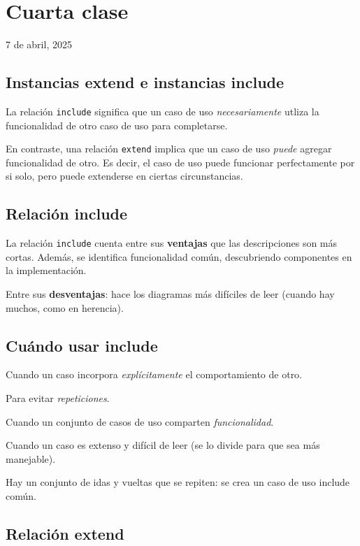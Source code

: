 \section{Cuarta clase}

7 de abril, 2025

\subsection{Instancias extend e instancias include}

La relación \texttt{include} significa que un caso de uso \textit{necesariamente} utliza la funcionalidad de otro caso de uso para completarse.

En contraste, una relación \texttt{extend} implica que un caso de uso \textit{puede} agregar funcionalidad de otro.
Es decir, el caso de uso puede funcionar perfectamente por si solo, pero puede extenderse en ciertas circunstancias.

\subsection{Relación include}

La relación \texttt{include} cuenta entre sus \textbf{ventajas} que las descripciones son más cortas.
Además, se identifica funcionalidad común, descubriendo componentes en la implementación.

Entre sus \textbf{desventajas}: hace los diagramas más difíciles de leer (cuando hay muchos, como en herencia).

\subsection{Cuándo usar include}

Cuando un caso incorpora \textit{explícitamente} el comportamiento de otro.

Para evitar \textit{repeticiones}.

Cuando un conjunto de casos de uso comparten \textit{funcionalidad}.

Cuando un caso es extenso y difícil de leer (se lo divide para que sea más manejable).

Hay un conjunto de idas y vueltas que se repiten:
se crea un caso de uso include común.

\subsection{Relación extend}


